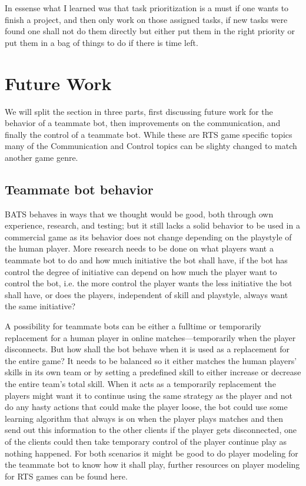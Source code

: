 In essense what I learned was that task prioritization is a must if one wants to finish a project, and then only work on those assigned tasks, if new tasks were found one shall not do them directly but either put them in the right priority or put them in a bag of things to do if there is time left.

\section{Future Work}
We will split the section in three parts, first discussing future work for the behavior of a teammate bot, then improvements on the communication, and finally the control of a teammate bot. While these are RTS game specific topics many of the Communication and Control topics can be slighty changed to match another game genre.

\subsection{Teammate bot behavior}
BATS behaves in ways that we thought would be good, both through own experience, research, and testing; but it still lacks a solid behavior to be used in a commercial game as its behavior does not change depending on the playstyle of the human player. More research needs to be done on what players want a teammate bot to do and how much initiative the bot shall have, if the bot has control the degree of initiative can depend on how much the player want to control the bot, i.e. the more control the player wants the less initiative the bot shall have, or does the players, independent of skill and playstyle, always want the same initiative?

A possibility for teammate bots can be either a fulltime or temporarily replacement for a human player in online matches—temporarily when the player disconnects. But how shall the bot behave when it is used as a replacement for the entire game? It needs to be balanced so it either matches the human players' skills in its own team or by setting a predefined skill to either increase or decrease the entire team's total skill. When it acts as a temporarily replacement the players might want it to continue using the same strategy as the player and not do any hasty actions that could make the player loose, the bot could use some learning algorithm that always is on when the player plays matches and then send out this information to the other clients if the player gets disconnected, one of the clients could then take temporary control of the player continue play as nothing happened. For both scenarios it might be good to do player modeling for the teammate bot to know how it shall play, further resources on player modeling for RTS games can be found here\cite{bakkes09, jansen07, kabanza10, schadd07, synnaeve11}.

